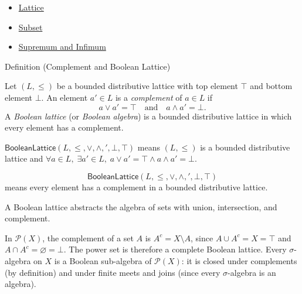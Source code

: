 \begin{dependencies}
\begin{itemize}
  \item \hyperref[def:lattice]{Lattice}
  \item \hyperref[def:subset]{Subset}
  \item \hyperref[def:sup-inf]{Supremum and Infimum}
\end{itemize}
\end{dependencies}

\begin{definitionbox}{Definition (Complement and Boolean Lattice)}
\begin{definition}\label{def:boolean-lattice}
Let $(L, \leq)$ be a bounded distributive lattice with top element $\top$ and
bottom element $\bot$.  An element $a' \in L$ is a \emph{complement} of
$a \in L$ if
\[
  a \vee a' = \top \quad \text{and} \quad a \wedge a' = \bot.
\]
A \emph{Boolean lattice} (or \emph{Boolean algebra}) is a bounded distributive
lattice in which every element has a complement.
\end{definition}
\end{definitionbox}

\begin{remark*}
$\mathsf{BooleanLattice}(L,\leq,\vee,\wedge,{}',\bot,\top)$ means
$(L,\leq)$ is a bounded distributive lattice and
$\forall a\in L,\;\exists a'\in L,\;a\vee a'=\top\wedge a\wedge a'=\bot$.
\end{remark*}

\begin{remark*}
\[
  \mathsf{BooleanLattice}(L,\leq,\vee,\wedge,{}',\bot,\top)
\] means every element
has a complement in a bounded distributive lattice.
\end{remark*}

\begin{remark*}[Interpretation]
A Boolean lattice abstracts the algebra of sets with union, intersection, and
complement.
\end{remark*}

\begin{remark*}[Exposition]
In $\mathcal{P}(X)$, the complement of a set $A$ is $A^c = X \setminus A$,
since $A \cup A^c = X = \top$ and $A \cap A^c = \varnothing = \bot$.  The
power set is therefore a complete Boolean lattice.  Every $\sigma$-algebra
on $X$ is a Boolean sub-algebra of $\mathcal{P}(X)$: it is closed under
complements (by definition) and under finite meets and joins (since every
$\sigma$-algebra is an algebra).
\end{remark*}


